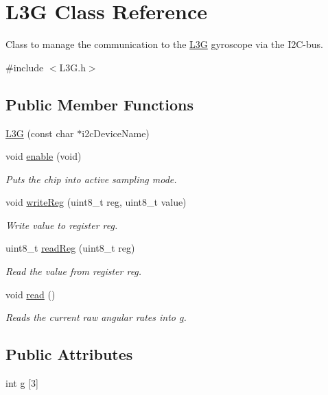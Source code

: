 \hypertarget{class_l3_g}{\section{\-L3\-G \-Class \-Reference}
\label{class_l3_g}
}


\-Class to manage the communication to the \hyperlink{class_l3_g}{\-L3\-G} gyroscope via the \-I2\-C-\/bus.  




{\ttfamily \#include $<$\-L3\-G.\-h$>$}

\subsection*{\-Public \-Member \-Functions}
\begin{DoxyCompactItemize}
\item 
\hyperlink{class_l3_g_a98c77b59983763302f3b9fde5b284a33}{\-L3\-G} (const char $\ast$i2c\-Device\-Name)
\item 
void \hyperlink{class_l3_g_a48decd4910020dc16c219e0081239c45}{enable} (void)
\begin{DoxyCompactList}\small\item\em \-Puts the chip into active sampling mode. \end{DoxyCompactList}\item 
void \hyperlink{class_l3_g_a6ab0e9d8b8349eb08ba97432660c258e}{write\-Reg} (uint8\-\_\-t reg, uint8\-\_\-t value)
\begin{DoxyCompactList}\small\item\em \-Write value to register reg. \end{DoxyCompactList}\item 
uint8\-\_\-t \hyperlink{class_l3_g_a5791e06a4e63a54300716780818ed726}{read\-Reg} (uint8\-\_\-t reg)
\begin{DoxyCompactList}\small\item\em \-Read the value from register reg. \end{DoxyCompactList}\item 
void \hyperlink{class_l3_g_a4b1913429824dc07bd2017c3755e7985}{read} ()
\begin{DoxyCompactList}\small\item\em \-Reads the current raw angular rates into \hyperlink{class_l3_g_a0cb874e50a2ea4753d81e9a46c7e45ce}{g}. \end{DoxyCompactList}\end{DoxyCompactItemize}
\subsection*{\-Public \-Attributes}
\begin{DoxyCompactItemize}
\item 
int \hyperlink{class_l3_g_a0cb874e50a2ea4753d81e9a46c7e45ce}{g} \mbox{[}3\mbox{]}
\end{DoxyCompactItemize}


